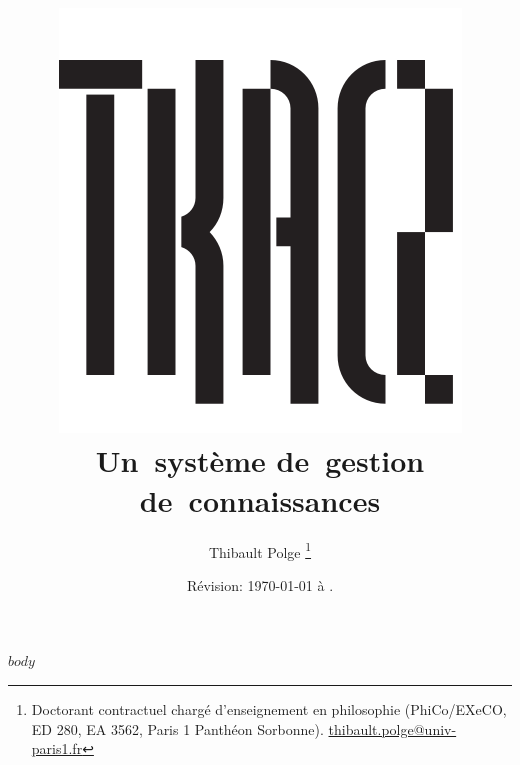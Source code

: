\documentclass[11pt, french, oneside]{book}
\begin{document}
\title{%
\vspace{-3cm}
\includegraphics{tkacz.pdf}
\\
Un~système de~gestion de~connaissances
}
\author{Thibault Polge%
\thanks{Doctorant contractuel chargé d'enseignement en philosophie (PhiCo/EXeCO, ED
280, EA 3562, Paris 1 Panthéon Sorbonne). \href{mailto:thibault.polge@univ-paris1.fr}{thibault.polge@univ-paris1.fr}
}
}

\date{Révision: \today{} à \currenttime.}
\date{}

\maketitle



$body$

\listoftables

%

\tableofcontents
\end{document}
